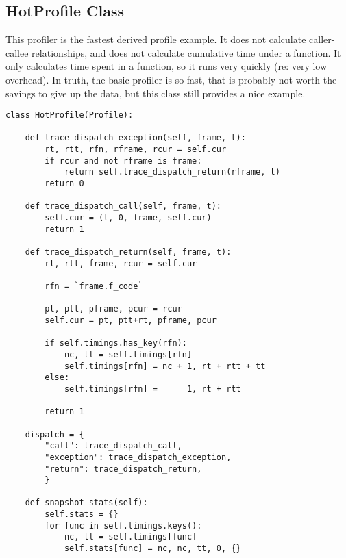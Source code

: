 \subsection{HotProfile Class \label{profile-HotProfile}}

This profiler is the fastest derived profile example.  It does not
calculate caller-callee relationships, and does not calculate
cumulative time under a function.  It only calculates time spent in a
function, so it runs very quickly (re: very low overhead).  In truth,
the basic profiler is so fast, that is probably not worth the savings
to give up the data, but this class still provides a nice example.

\begin{verbatim}
class HotProfile(Profile):

    def trace_dispatch_exception(self, frame, t):
        rt, rtt, rfn, rframe, rcur = self.cur
        if rcur and not rframe is frame:
            return self.trace_dispatch_return(rframe, t)
        return 0

    def trace_dispatch_call(self, frame, t):
        self.cur = (t, 0, frame, self.cur)
        return 1

    def trace_dispatch_return(self, frame, t):
        rt, rtt, frame, rcur = self.cur

        rfn = `frame.f_code`

        pt, ptt, pframe, pcur = rcur
        self.cur = pt, ptt+rt, pframe, pcur

        if self.timings.has_key(rfn):
            nc, tt = self.timings[rfn]
            self.timings[rfn] = nc + 1, rt + rtt + tt
        else:
            self.timings[rfn] =      1, rt + rtt

        return 1

    dispatch = {
        "call": trace_dispatch_call,
        "exception": trace_dispatch_exception,
        "return": trace_dispatch_return,
        }

    def snapshot_stats(self):
        self.stats = {}
        for func in self.timings.keys():
            nc, tt = self.timings[func]
            self.stats[func] = nc, nc, tt, 0, {}
\end{verbatim}
